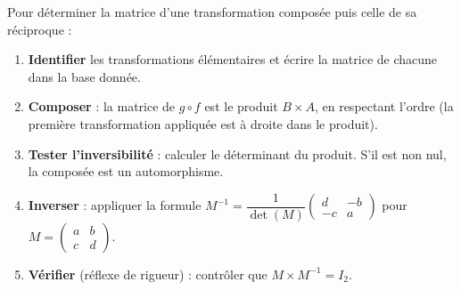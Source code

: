 \documentclass[11pt]{article}
\begin{document}
\begin{methode}
Pour déterminer la matrice d'une transformation composée puis celle de sa réciproque :
\begin{enumerate}
\item \textbf{Identifier} les transformations élémentaires et écrire la matrice de chacune dans la base donnée.
\item \textbf{Composer} : la matrice de $g \circ f$ est le produit $B \times A$, en respectant l'ordre (la première transformation appliquée est à droite dans le produit).
\item \textbf{Tester l'inversibilité} : calculer le déterminant du produit. S'il est non nul, la composée est un automorphisme.
\item \textbf{Inverser} : appliquer la formule $M^{-1} = \dfrac{1}{\det(M)}\begin{pmatrix} d & -b \\ -c & a \end{pmatrix}$ pour $M = \begin{pmatrix} a & b \\ c & d \end{pmatrix}$.
\item \textbf{Vérifier} (réflexe de rigueur) : contrôler que $M \times M^{-1} = I_2$.
\end{enumerate}
\end{methode}
\end{document}
